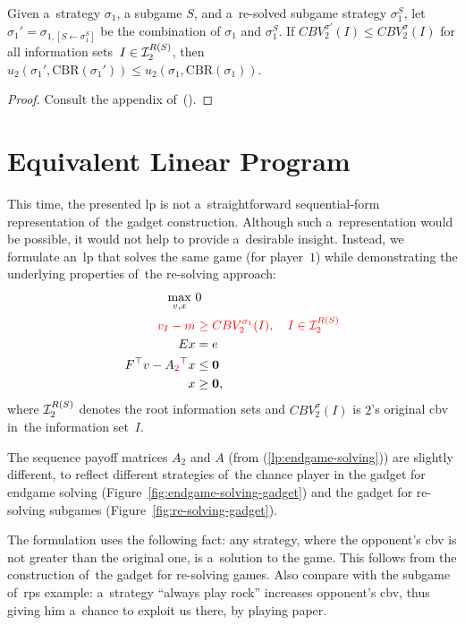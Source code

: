 \begin{thm}
  \label{thm:cf-val-and-utility}
  Given a~strategy $\sigma_1$, a subgame $S$, and a~re-solved subgame strategy $\sigma_1^S$, let $\sigma_1' = \sigma_{1, [S \leftarrow \sigma_1^S]}$ be the combination of $\sigma_1$ and $\sigma_1^S$.
  If $CBV_2^{\sigma'}(I) \leq  CBV_2^{\sigma}(I)$ for all information sets~$I\in\mathcal{I}_2^{R(S)}$, then $u_2(\sigma_1', \textrm{CBR}(\sigma_1')) \leq  u_2(\sigma_1, \textrm{CBR}(\sigma_1))$.
\end{thm}
\begin{proof}
  Consult the appendix of~(\cite{BurchJohansonBowling2014}).
\end{proof}

\section{Equivalent Linear Program}
This time, the presented \acrshort{lp} is not a~straightforward sequential-form representation of~the gadget construction.
Although such a~representation would be possible, it would not help to provide a~desirable insight.
Instead, we formulate an~\acrshort{lp} that solves the same game (for player~$1$) while demonstrating the underlying properties of~the re-solving approach:
\begin{equation}
  \label{lp:cfr-d}
  \begin{split}
    \max_{v, x}\ &0 \\
    \color{red}
      v_I - m &
    \color{red}
      \ge CBV_2^{\sigma_1}(I), \quad I \in \mathcal{I}_2^{R(S)}\\ 
    Ex &= e \\
    F^\top v - A_{\color{red}2}^\top x &\le \boldsymbol{0} \\
    x &\ge \boldsymbol{0},
  \end{split}
\end{equation}
where $\mathcal{I}_2^{R(S)}$ denotes the root information sets and $CBV_2^\sigma(I)$ is $2$'s original \acrlong{cbv} in~the information set~$I$.

The sequence payoff matrices $A_2$ and $A$ (from (\ref{lp:endgame-solving})) are slightly different, to reflect different strategies of~the chance player in the gadget for endgame solving (Figure~\ref{fig:endgame-solving-gadget}) and the gadget for re-solving subgames (Figure~\ref{fig:re-solving-gadget}).

The formulation uses the following fact:
any strategy, where the opponent's \acrshort{cbv} is not greater than the original one, is a~solution to the game.
This follows from the construction of~the gadget for re-solving games.
Also compare with the subgame of~\acrshort{rps} example:
a~strategy ``always play rock'' increases opponent's \acrshort{cbv}, thus giving him a~chance to exploit us there, by playing paper.

